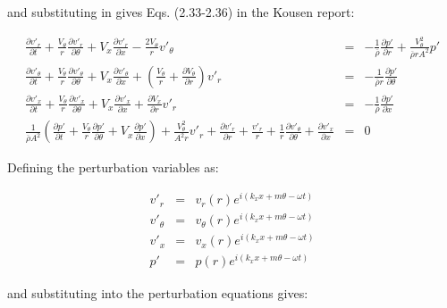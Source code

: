 \documentclass[12pt]{article}
\begin{document}
and substituting in gives Eqs. (2.33-2.36) in the Kousen report:

\begin{eqnarray}
\frac{\partial v'_r}{\partial t} 
+ \frac{V_{\theta}}{r}
\frac{\partial v'_r}{\partial \theta}
+V_x \frac{\partial v'_r}{\partial x}
-\frac{2 V_{\theta}}{r} v'_{\theta}
&=&
-\frac{1}{\overline{\rho}} \frac{\partial p'}{\partial r}
+\frac{V_{\theta}^2}{\overline{\rho} r A^2} p'
\nonumber
\\
\frac{\partial v'_{\theta}}{\partial t} 
+ \frac{V_{\theta}}{r}
\frac{\partial v'_{\theta}}{\partial \theta}
+V_x \frac{\partial v'_{\theta}}{\partial x}
+
\left(
\frac{V_{\theta}}{r}
+\frac{\partial V_{\theta}}{\partial r}
\right) v'_r
&=&
-\frac{1}{\overline{\rho} r} \frac{\partial p'}{\partial \theta}
\nonumber
\\
\frac{\partial v'_x}{\partial t} 
+ \frac{V_{\theta}}{r}
\frac{\partial v'_x}{\partial \theta}
+V_x \frac{\partial v'_x}{\partial x}
+\frac{\partial V_x}{\partial r} v'_r
&=&
-\frac{1}{\overline{\rho}} \frac{\partial p'}{\partial x}
\nonumber
\\
\frac{1}{ \overline{\rho} A^2}
\left(
\frac{\partial p'}{\partial t} 
+ \frac{V_{\theta}}{r} \frac{\partial p'}{\partial \theta}
+ V_x \frac{\partial p'}{\partial x}
\right)
+\frac{V_{\theta}^2}{A^2 r}
v'_r
+ 
\frac{\partial v'_r}{\partial r}
+ 
\frac{v'_r}{r} 
+\frac{1}{r} \frac{\partial v'_{\theta} }{\partial \theta}
+ \frac{\partial v'_x }{\partial x}
&=&
0
\nonumber
\end{eqnarray}

Defining the perturbation variables as:

\begin{eqnarray}
v'_r &=& v_r \left(r \right) e^{i \left(k_x x + m \theta - \omega t \right)}
\nonumber
\\
v'_{\theta} &=& v_{\theta} \left(r \right) e^{i \left(k_x x + m \theta - \omega t \right)}
\nonumber
\\
v'_x &=& v_x \left(r \right) e^{i \left(k_x x + m \theta - \omega t \right)}
\nonumber
\\
p' &=& p \left(r \right) e^{i \left(k_x x + m \theta - \omega t \right)}
\nonumber
\end{eqnarray}

and substituting into the perturbation equations gives:
\end{document}
